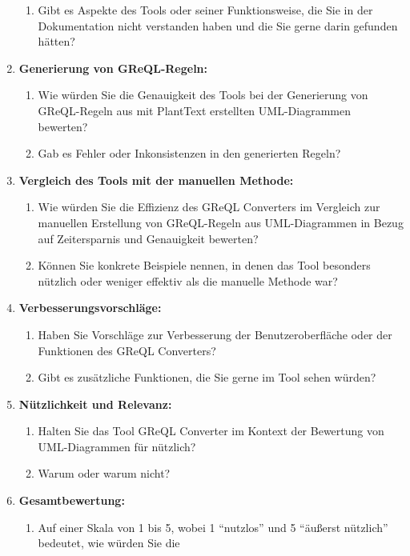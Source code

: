 \begin{enumerate}
\begin{enumerate}
        \item Gibt es Aspekte des Tools oder seiner Funktionsweise, die Sie in der Dokumentation nicht
        verstanden haben und die Sie gerne darin gefunden hätten?
    \end{enumerate}
    \item \textbf{Generierung von GReQL-Regeln:}
    \begin{enumerate}
        \item Wie würden Sie die Genauigkeit des Tools bei der Generierung von GReQL-Regeln aus mit PlantText
        erstellten UML-Diagrammen bewerten?
        \item Gab es Fehler oder Inkonsistenzen in den generierten Regeln?
    \end{enumerate}
    \item \textbf{Vergleich des Tools mit der manuellen Methode:}
    \begin{enumerate}
        \item Wie würden Sie die Effizienz des GReQL Converters im Vergleich zur manuellen Erstellung von GReQL-Regeln
        aus UML-Diagrammen in Bezug auf Zeitersparnis und Genauigkeit bewerten?
        \item Können Sie konkrete Beispiele nennen, in denen das Tool besonders nützlich oder weniger effektiv als
        die manuelle Methode war?
    \end{enumerate}
    \item \textbf{Verbesserungsvorschläge:}
    \begin{enumerate}
        \item Haben Sie Vorschläge zur Verbesserung der Benutzeroberfläche oder der Funktionen des GReQL Converters?
        \item Gibt es zusätzliche Funktionen, die Sie gerne im Tool sehen würden?
    \end{enumerate}
    \item \textbf{Nützlichkeit und Relevanz:}
    \begin{enumerate}
        \item Halten Sie das Tool GReQL Converter im Kontext der Bewertung von UML-Diagrammen für nützlich?
        \item Warum oder warum nicht?
    \end{enumerate}
    \item \textbf{Gesamtbewertung:}
    \begin{enumerate}
        \item Auf einer Skala von 1 bis 5, wobei 1 ``nutzlos'' und 5 ``äußerst nützlich'' bedeutet, wie würden Sie die

\end{enumerate}
\end{enumerate}
